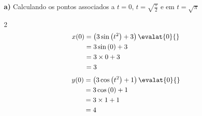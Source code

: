 \documentclass[a4paper,12pt,fleqn]{article}
\begin{document}
\begin{answer}
  \textbf{a)} \quad
  Calculando os pontos associados a $t=0$, $t=\sqrt{\frac{\pi}{2}}$ e em $t=\sqrt{\pi}$
  \begin{multicols}{2}
    \begin{align*}
      x(0)
      & = \left(3 \sin\left(t^2\right) +3\right) \evalat{0}{} \\
      & = 3 \sin\left(0\right) +3 \\
      & = 3 \times 0 +3 \\
      & = 3
    \end{align*}
    \newcolumn
    \begin{align*}
      y(0)
      & = \left(3 \cos\left(t^2\right) +1\right) \evalat{0}{} \\
      & = 3 \cos\left(0\right) +1 \\
      & = 3 \times 1 +1 \\
      & = 4
    \end{align*}
  \end{multicols}


\end{answer}
\end{document}
